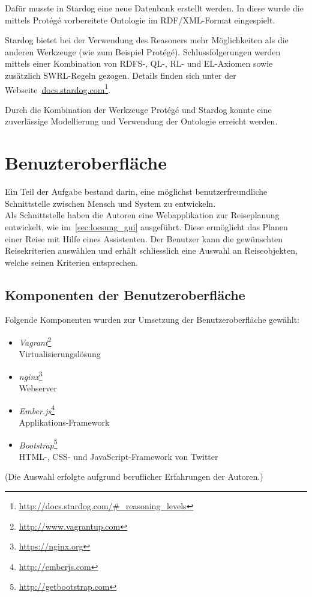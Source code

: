 Dafür musste in Stardog eine neue Datenbank erstellt werden. In diese wurde die mittels Protégé vorbereitete Ontologie im RDF/XML-Format eingespielt.

Stardog bietet bei der Verwendung des Reasoners mehr Möglichkeiten als die anderen Werkzeuge (wie zum Beispiel Protégé). Schlussfolgerungen werden mittels einer Kombination von RDFS-, QL-, RL- und EL-Axiomen sowie zusätzlich SWRL-Regeln gezogen. Details finden sich unter der Webseite~\href{http://docs.stardog.com/\#_reasoning_levels}{docs.stardog.com}\footnote{\url{http://docs.stardog.com/\#_reasoning_levels}}.


Durch die Kombination der Werkzeuge Protégé und Stardog konnte eine zuverlässige Modellierung und Verwendung der Ontologie erreicht werden.

\section{Benuzteroberfläche}
\label{sec:komponenten:ember}
Ein Teil der Aufgabe bestand darin, eine möglichst benutzerfreundliche Schnittstelle zwischen Mensch und System zu entwickeln.\\
Als Schnittstelle haben die Autoren eine Webapplikation zur Reiseplanung entwickelt, wie im~\autoref{sec:loesung_gui} ausgeführt. Diese ermöglicht das Planen einer Reise mit Hilfe eines Assistenten. Der Benutzer kann die gewünschten Reisekriterien auswählen und erhält schliesslich eine Auswahl an Reiseobjekten, welche seinen Kriterien entsprechen.

\subsection{Komponenten der Benutzeroberfläche}
\label{subsec:komponenten:gui:komponenten}
Folgende Komponenten wurden zur Umsetzung der Benutzeroberfläche gewählt:
\begin{itemize}
    \item \textit{Vagrant}\footnote{\url{http://www.vagrantup.com}}\\
        Virtualisierungslösung
    \item \textit{nginx}\footnote{\url{https://nginx.org}}\\
        Webserver
    \item \textit{Ember.js}\footnote{\url{http://emberjs.com}}\\
        Applikations-Framework
    \item \textit{Bootstrap}\footnote{\url{http://getbootstrap.com}}\\
        HTML-, CSS- und JavaScript-Framework von Twitter
\end{itemize}
(Die Auswahl erfolgte aufgrund beruflicher Erfahrungen der Autoren.)


